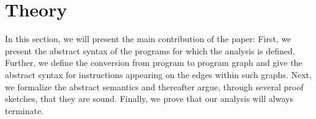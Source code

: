 \section{Theory}\label{sec:theory}
In this section, we will present the main contribution of the paper:
First, we present the abstract syntax of the programs for which the analysis is defined.
Further, we define the conversion from program to program graph and give the abstract syntax for instructions appearing on the edges within such graphs.
Next, we formalize the abstract semantics and thereafter argue, through several proof sketches, that they are sound.
Finally, we prove that our analysis will always terminate.







